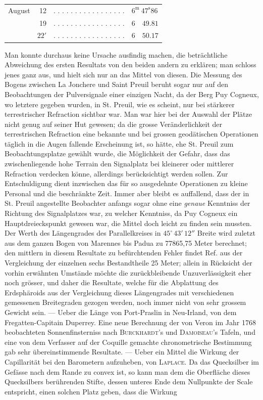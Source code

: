\begin{center}\small\setlength{\tabcolsep}{3pt}
\begin{tabular}{lrll}
August & 12 & . . . . . . . . . . . . . . . . . & $6^{\mathrm m}\ 47^{\mathrm s}86$ \\
 & 19 & . . . . . . . . . . . . . . . . . & $6\quad49.81$ \\
 & $22'$ & . . . . . . . . . . . . . . . . . & $6\quad50.17$ \\
\end{tabular}\end{center}
\noindent Man konnte durchaus keine Ursache ausfindig machen, die beträchtliche Abweichung des ersten Resultats von den beiden andern zu erklären; man schloss jenes ganz aus, und hielt sich nur an das Mittel von diesen. Die Messung des Bogens zwischen La Jonchere und Saint Preuil beruht sogar nur auf den Beobachtungen der Pulversignale einer einzigen Nacht, da der Berg Puy Cogneux, wo letztere gegeben wurden, in St. Preuil, wie es scheint, nur bei stärkerer terrestrischer Refraction sichtbar war. Man war hier bei der Auswahl der Plätze nicht genug auf seiner Hut gewesen; da die grosse Veränderlichkeit der terrestrischen Refraction eine bekannte und bei grossen geodätischen Operationen täglich in die Augen fallende Erscheinung ist, so hätte, ehe St. Preuil zum Beobachtungsplatze gewählt wurde, die Möglichkeit der Gefahr, dass das zwischenliegende hohe Terrain den Signalplatz bei kleinerer oder mittlerer Refraction verdecken könne, allerdings berücksichtigt werden sollen. Zur Entschuldigung dient inzwischen das für so ausgedehnte Operationen zu kleine Personal und die beschränkte Zeit. Immer aber bleibt es auffallend, dass der in St. Preuil angestellte Beobachter anfangs sogar ohne eine \emph{genaue} Kenntniss der Richtung des Signalplatzes war, zu welcher Kenntniss, da Puy Cogneux ein Hauptdreieckspunkt gewesen war, die Mittel doch leicht zu finden sein mussten. Der Werth des Längengrades des Parallelkreises in $45^\circ\,43'\,12''$ Breite wird zuletzt aus dem ganzen Bogen von Marennes bis Padua zu 77865,75 Meter berechnet; den mittlern in diesem Resultate zu befürchtenden Fehler findet Ref. aus der Vergleichung der einzelnen sechs Bestandtheile 25 Meter; allein in Rücksicht der vorhin erwähnten Umstände möchte die zurückbleibende Unzuverlässigkeit eher noch grösser, und daher die Resultate, welche für die Abplattung des Erdsphäroids aus der Vergleichung dieses Längengrades mit verschiedenen gemessenen Breitegraden gezogen werden, noch immer nicht von sehr grossem Gewicht sein. — Ueber die Länge von Port-Praslin in Neu-Irland, von dem Fregatten-Capitain Duperrey. Eine neue Berechnung der von Veron im Jahr 1768 beobachteten Sonnenfinsterniss nach \textsc{Burckhardt}'s und \textsc{Damoiseau}'s Tafeln, und eine von dem Verfasser auf der Coquille gemachte chronometrische Bestimmung gab sehr übereinstimmende Resultate. — Ueber ein Mittel die Wirkung der Capillarität bei den Barometern aufzuheben, von \textsc{Laplace}. Da das Quecksilber im Gefässe nach dem Rande zu convex ist, so kann man dem die Oberfläche dieses Quecksilbers berührenden Stifte, dessen unteres Ende dem Nullpunkte der Scale entspricht, einen solchen Platz geben, dass die Wirkung 